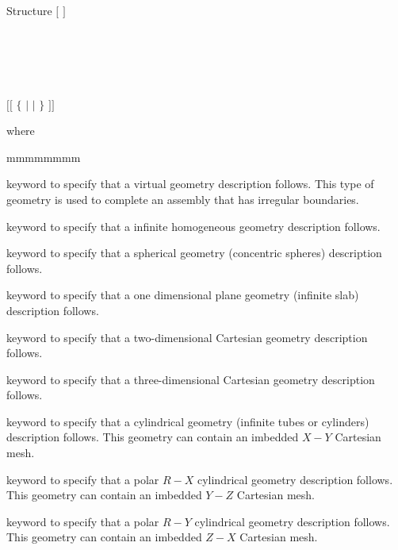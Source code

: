 \begin{DataStructure}{Structure }
$[$   $]$ \\
 \\
 \\
 \\
 \\
 \\
$[[$ \moc{:::}  \moc{:=}  $\{$  $|$
 $|$
 $\}$ $]]$ \\
\moc{;} 
\end{DataStructure}

\noindent
where

\begin{ListeDeDescription}{mmmmmmmm}

\item[\moc{VIRTUAL}] keyword to specify that a virtual geometry description
follows. This type of geometry is used to complete an assembly that has
irregular boundaries.

\item[\moc{HOMOGE}] keyword to specify that a infinite homogeneous geometry
description follows.

\item[\moc{SPHERE}] keyword to specify that a spherical geometry  (concentric
spheres) description follows.

\item[\moc{CAR1D}] keyword to specify that a one dimensional plane geometry
(infinite slab) description follows.

\item[\moc{CAR2D}] keyword to specify that a two-dimensional Cartesian
geometry description follows.

\item[\moc{CAR3D}] keyword to specify that a three-dimensional Cartesian
geometry description follows.

\item[\moc{TUBE}] keyword to specify that a cylindrical geometry (infinite
tubes or cylinders) description follows. This geometry can contain an imbedded $X-Y$ Cartesian mesh.

\item[\moc{TUBEX}] keyword to specify that a polar $R-X$ cylindrical geometry
description follows. This geometry can contain an imbedded $Y-Z$ Cartesian mesh.

\item[\moc{TUBEY}] keyword to specify that a polar $R-Y$ cylindrical geometry
description follows. This geometry can contain an imbedded $Z-X$ Cartesian mesh.


\end{ListeDeDescription}
